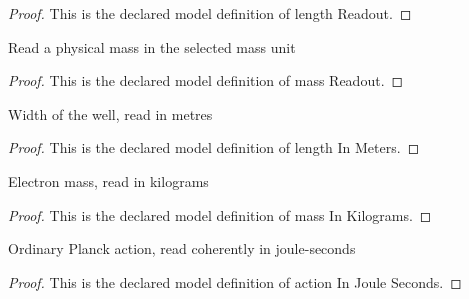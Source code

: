 \begin{proof}
  This is the declared model definition of length Readout.
\end{proof}
\begin{definition}
  \label{def:physics:phyx-mini-0581:phyxminiproblems-problemphyxmini0581-massreadout}
  Read a physical mass in the selected mass unit
\end{definition}
\begin{proof}
  This is the declared model definition of mass Readout.
\end{proof}
\begin{definition}
  \label{def:physics:phyx-mini-0581:phyxminiproblems-problemphyxmini0581-lengthinmeters}
  Width of the well, read in metres
\end{definition}
\begin{proof}
  This is the declared model definition of length In Meters.
\end{proof}
\begin{definition}
  \label{def:physics:phyx-mini-0581:phyxminiproblems-problemphyxmini0581-massinkilograms}
  Electron mass, read in kilograms
\end{definition}
\begin{proof}
  This is the declared model definition of mass In Kilograms.
\end{proof}
\begin{definition}
  \label{def:physics:phyx-mini-0581:phyxminiproblems-problemphyxmini0581-actioninjouleseconds}
  Ordinary Planck action, read coherently in joule-seconds
\end{definition}
\begin{proof}
  This is the declared model definition of action In Joule Seconds.
\end{proof}

